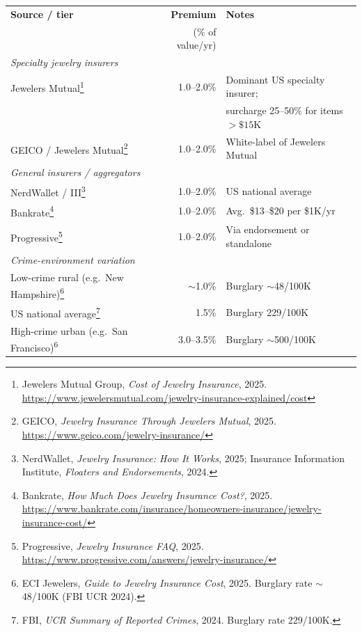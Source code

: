 \documentclass[a4paper,11pt]{article}
\begin{document}
\begin{center}
\small
\begin{tabular}{l r l}
\toprule
\textbf{Source / tier} & \textbf{Premium} & \textbf{Notes} \\
& (\% of value/yr) & \\
\midrule
\multicolumn{3}{l}{\textit{Specialty jewelry insurers}} \\
Jewelers Mutual\footnote{Jewelers Mutual Group, \textit{Cost of Jewelry Insurance}, 2025. \url{https://www.jewelersmutual.com/jewelry-insurance-explained/cost}} & 1.0--2.0\% & Dominant US specialty insurer; \\
& & surcharge 25--50\% for items $>\$15$K \\
GEICO / Jewelers Mutual\footnote{GEICO, \textit{Jewelry Insurance Through Jewelers Mutual}, 2025. \url{https://www.geico.com/jewelry-insurance/}} & 1.0--2.0\% & White-label of Jewelers Mutual \\
\midrule
\multicolumn{3}{l}{\textit{General insurers / aggregators}} \\
NerdWallet / III\footnote{NerdWallet, \textit{Jewelry Insurance: How It Works}, 2025; Insurance Information Institute, \textit{Floaters and Endorsements}, 2024.} & 1.0--2.0\% & US national average \\
Bankrate\footnote{Bankrate, \textit{How Much Does Jewelry Insurance Cost?}, 2025. \url{https://www.bankrate.com/insurance/homeowners-insurance/jewelry-insurance-cost/}} & 1.0--2.0\% & Avg.\ \$13--\$20 per \$1K/yr \\
Progressive\footnote{Progressive, \textit{Jewelry Insurance FAQ}, 2025. \url{https://www.progressive.com/answers/jewelry-insurance/}} & 1.0--2.0\% & Via endorsement or standalone \\
\midrule
\multicolumn{3}{l}{\textit{Crime-environment variation}} \\
Low-crime rural (e.g.\ New Hampshire)\footnote{ECI Jewelers, \textit{Guide to Jewelry Insurance Cost}, 2025. Burglary rate $\sim$48/100K (FBI UCR 2024).} & $\sim$1.0\% & Burglary $\sim$48/100K \\
US national average\footnote{FBI, \textit{UCR Summary of Reported Crimes}, 2024. Burglary rate 229/100K.} & 1.5\% & Burglary 229/100K \\
High-crime urban (e.g.\ San Francisco)\textsuperscript{6} & 3.0--3.5\% & Burglary $\sim$500/100K \\
\bottomrule
\end{tabular}
\end{center}
\end{document}
